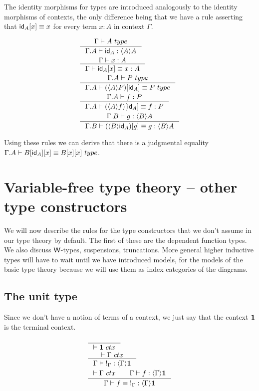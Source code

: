 The identity morphisms for types are introduced analogously to the identity
morphisms of contexts, the only difference being that we have a rule asserting
that $\subst{x}{\idfunc[A]}\jdeq x$ for every term $x:A$ in context $\Gamma$.

\begin{align}
& \inference{\jtype{\Gamma}{A}}{\jterm{\ctxext{\Gamma}{A}}{\ctxwk{A}{A}}{\idfunc[A]}}\\
& \inference{\jterm{\Gamma}{A}{x}}{\jtermeq{\Gamma}{A}{\subst{x}{\idfunc[A]}}{x}}\\
& \inference{\jtype{\ctxext{\Gamma}{A}}{P}}{\jtypeeq{\ctxext{\Gamma}{A}}{\subst{\idfunc[A]}{\ctxwk{A}{P}}}{P}}\\
& \inference{\jterm{\ctxext{\Gamma}{A}}{P}{f}}{\jtermeq{\ctxext{\Gamma}{A}}{P}{\subst{\idfunc[A]}{\ctxwk{A}{f}}}{f}} \\
& \inference{\jterm{\ctxext{\Gamma}{B}}{\ctxwk{B}{A}}{g}}{\jtermeq{\ctxext{\Gamma}{B}}{\ctxwk{B}{A}}{\subst{g}{\ctxwk{B}{\idfunc[A]}}}{g}}
\end{align}

Using these rules we can derive that there is a judgmental equality $\jtypeeq{\ctxext{\Gamma}{A}}{\subst{x}{{\idfunc[A]}{B}}}
{\subst{x}{{x}{B}}}$.



\section{Variable-free type theory -- other type constructors}
We will now describe the rules for the type constructors that we don't assume
in our type theory by default. The first of these are the dependent function
types. We also discuss $\mathsf{W}$-types, suspensions, truncations. More general higher inductive
types will have to wait until we have introduced models, for the models of the
basic type theory because we will use them as index categories of the diagrams.

\subsection{The unit type}
Since we don't have a notion of terms of a context, we just say that the context
$\mathbf{1}$ is the terminal context.

\begin{align}
& \inference{}{\jctx{\unit}}\\
& \inference{\jctx{\Gamma}}{\jhom{\Gamma}{\unit}{\tounit{\Gamma}}}\\
& \inference{\jctx{\Gamma}\qquad\jhom{\Gamma}{\unit}{f}}{\jhomeq{\Gamma}{\unit}{f}{\tounit{\Gamma}}}
\end{align}

